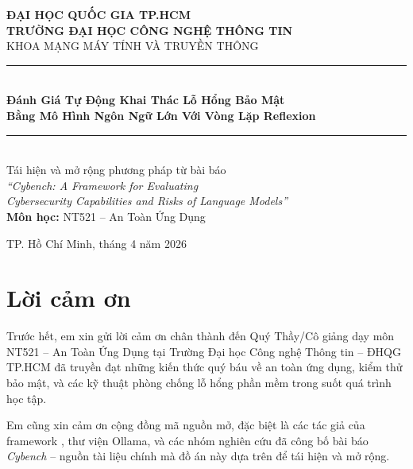 \documentclass{nt521report}
\newcommand{\reporttitle}{%
  Đánh Giá Tự Động Khai Thác Lỗ Hổng Bảo Mật\\
  Bằng Mô Hình Ngôn Ngữ Lớn Với Vòng Lặp Reflexion%
}
\newcommand{\reportsubtitle}{%
  Tái hiện và mở rộng phương pháp từ bài báo\\
  \emph{``Cybench: A Framework for Evaluating\\Cybersecurity Capabilities and Risks of Language Models''}%
}
\newcommand{\coursename}{NT521 -- An Toàn Ứng Dụng}
\newcommand{\university}{ĐẠI HỌC QUỐC GIA TP.HCM\\TRƯỜNG ĐẠI HỌC CÔNG NGHỆ THÔNG TIN}
\begin{document}
\begin{titlepage}
  \centering
  \vspace*{0.5cm}

  {\large\textbf{\university}}\\[0.4cm]
  {\large KHOA MẠNG MÁY TÍNH VÀ TRUYỀN THÔNG}\\[1cm]

  \rule{\linewidth}{0.5pt}\\[0.6cm]
  {\LARGE\bfseries\color{MidnightBlue} \reporttitle}\\[0.5cm]
  \rule{\linewidth}{0.5pt}\\[0.8cm]

  {\large \reportsubtitle}\\[1.5cm]

  {\Large\textbf{Môn học:} \coursename}\\[2cm]


  \vfill

  {\large TP. Hồ Chí Minh, tháng 4 năm 2026}
\end{titlepage}

\chapter*{Lời cảm ơn}

Trước hết, em xin gửi lời cảm ơn chân thành đến Quý Thầy/Cô giảng dạy môn \coursename{} tại Trường Đại học Công nghệ Thông tin -- ĐHQG TP.HCM đã truyền đạt những kiến thức quý báu về an toàn ứng dụng, kiểm thử bảo mật, và các kỹ thuật phòng chống lỗ hổng phần mềm trong suốt quá trình học tập.

Em cũng xin cảm ơn cộng đồng mã nguồn mở, đặc biệt là các tác giả của framework , thư viện Ollama, và các nhóm nghiên cứu đã công bố bài báo \emph{Cybench} -- nguồn tài liệu chính mà đồ án này dựa trên để tái hiện và mở rộng.
\end{document}
